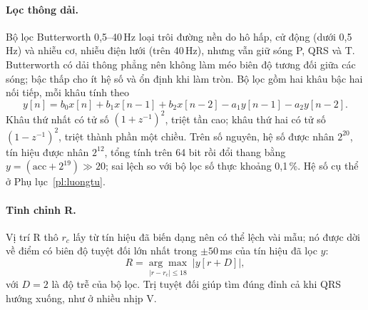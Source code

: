 \paragraph{Lọc thông dải.}
Bộ lọc Butterworth 0{,}5--40\,Hz loại trôi đường nền do hô hấp, cử động (dưới 0{,}5\,Hz) và nhiễu cơ, nhiễu điện lưới (trên 40\,Hz), nhưng vẫn giữ sóng P, QRS và T.
Butterworth có dải thông phẳng nên không làm méo biên độ tương đối giữa các sóng; bậc thấp cho ít hệ số và ổn định khi làm tròn.
Bộ lọc gồm hai khâu bậc hai nối tiếp, mỗi khâu tính theo
\begin{equation}
  y[n]=b_0x[n]+b_1x[n-1]+b_2x[n-2]-a_1y[n-1]-a_2y[n-2].
  \label{eq:ch4-biquad}
\end{equation}
Khâu thứ nhất có tử số $(1+z^{-1})^2$, triệt tần cao; khâu thứ hai có tử số $(1-z^{-1})^2$, triệt thành phần một chiều.
Trên số nguyên, hệ số được nhân $2^{20}$, tín hiệu được nhân $2^{12}$, tổng tính trên 64 bit rồi đổi thang bằng $y=(\mathrm{acc}+2^{19})\gg20$; sai lệch so với bộ lọc số thực khoảng 0{,}1\,\%.
Hệ số cụ thể ở Phụ lục~\ref{pl:luongtu}.

\paragraph{Tinh chỉnh R.}
Vị trí R thô $r_c$ lấy từ tín hiệu đã biến dạng nên có thể lệch vài mẫu; nó được dời về điểm có biên độ tuyệt đối lớn nhất trong $\pm50$\,ms của tín hiệu đã lọc $y$:
\begin{equation}
  R=\underset{|r-r_c|\le18}{\arg\max}\;\big|y[r+D]\big|,
  \label{eq:ch4-refine}
\end{equation}
với $D=2$ là độ trễ của bộ lọc.
Trị tuyệt đối giúp tìm đúng đỉnh cả khi QRS hướng xuống, như ở nhiều nhịp V.
